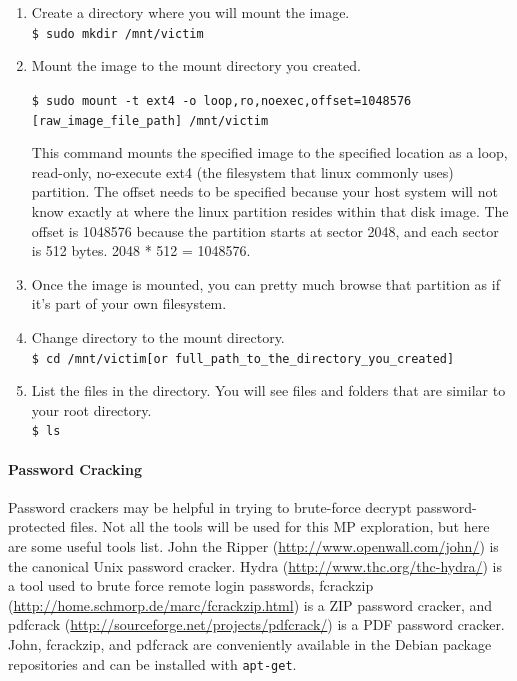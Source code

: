\documentclass[letterpaper,12pt]{report}
\begin{document}
\begin{enumerate}
    \item Create a directory where you will mount the image.\\
        \texttt{\$ sudo mkdir /mnt/victim}
    \item Mount the image to the mount directory you created.
        \begin{sloppypar}
        \texttt{\$ sudo mount -t ext4 -o loop,ro,noexec,offset=1048576 [raw\_image\_file\_path] /mnt/victim}
        \end{sloppypar}
        This command mounts the specified image to the specified location as a loop, read-only, no-execute ext4 (the filesystem that linux commonly uses) partition. 
        The offset needs to be specified because your host system will not know exactly at where the linux partition resides within that disk image. 
        The offset is 1048576 because the partition starts at sector 2048, and each sector is 512 bytes. 2048 * 512 = 1048576.
    \item Once the image is mounted, you can pretty much browse that partition as if it's part of your own filesystem.
    \item Change directory to the mount directory.\\
        \texttt{\$ cd /mnt/victim[or full\_path\_to\_the\_directory\_you\_created]}
    \item List the files in the directory. You will see files and folders that are similar to your root directory.\\
        \texttt{\$ ls}
\end{enumerate}

\paragraph{Password Cracking}
Password crackers may be helpful in trying to brute-force decrypt password-protected files.  Not all the tools will be used for this MP exploration, but here are some useful tools list.  John the Ripper (\url{http://www.openwall.com/john/}) is the canonical Unix password cracker.  Hydra  (\url{http://www.thc.org/thc-hydra/}) is a tool used to brute force remote login passwords, fcrackzip (\url{http://home.schmorp.de/marc/fcrackzip.html}) is a ZIP password cracker, and pdfcrack (\url{http://sourceforge.net/projects/pdfcrack/}) is a PDF password cracker. John, fcrackzip, and pdfcrack are conveniently available in the Debian package repositories and can be installed with \texttt{apt-get}.
\end{document}
